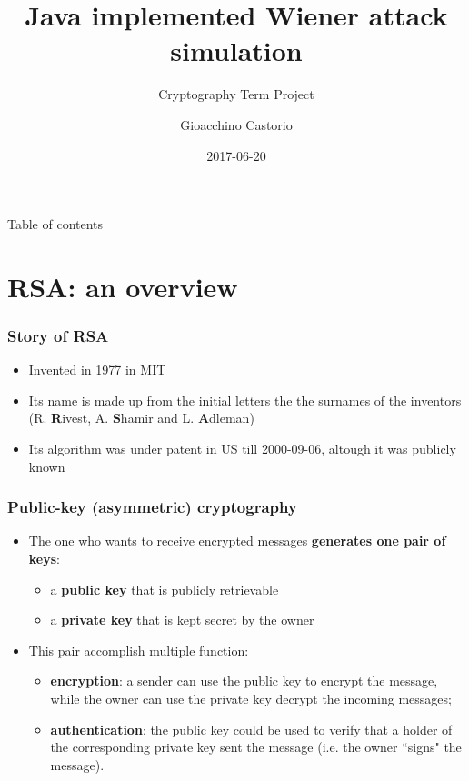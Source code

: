 \documentclass{beamer}
\title{Java implemented Wiener attack simulation}
\subtitle{Cryptography Term Project}
\author{Gioacchino Castorio}
\institute{Università dell'Aquila}
\date{2017-06-20}
\begin{document}
\frame{\titlepage}

\begin{frame}{Table of contents}
\tableofcontents
\end{frame}

\section{RSA: an overview}

\frame{\sectionpage}


	\begin{frame}
    \frametitle{Story of RSA}
    \begin{itemize}
     	\item Invented in 1977 in MIT
     	\item Its name is made up from the initial letters the the surnames of the inventors (R. \textbf{R}ivest, A. \textbf{S}hamir and L. \textbf{A}dleman)
     	\item Its algorithm was under patent in US till 2000-09-06, altough it was publicly known
    \end{itemize}
  \end{frame}
  
  
  \begin{frame}
    \frametitle{Public-key (asymmetric) cryptography}
    \begin{itemize}
    		\item The one who wants to receive encrypted messages \textbf{generates one pair of keys}: 
    		\begin{itemize}
    			\item a \textbf{public key} that is publicly retrievable
    			\item a \textbf{private key} that is kept secret by the owner
    		\end{itemize} 	 
    		\item This pair accomplish multiple function:
    		\begin{itemize}
    			\item \textbf{encryption}: a sender can use the public key to encrypt the message, while the owner can use the private key decrypt the incoming messages;
    			\item \textbf{authentication}: the public key could be used to verify that a holder of the corresponding private key sent the message (i.e. the owner ``signs" the message).
    		\end{itemize}
    \end{itemize}
  \end{frame}
  
\end{document}
